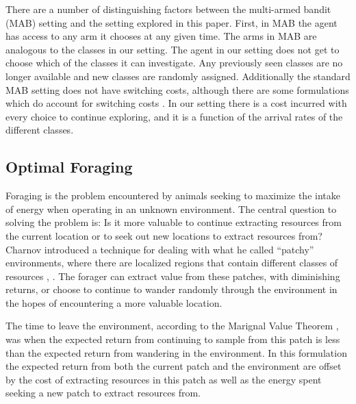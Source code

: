 
There are a number of distinguishing factors between the multi-armed bandit
(MAB) setting and the setting explored in this paper.  First, in MAB the agent
has access to any arm it chooses at any given time.  The arms in MAB are
analogous to the classes in our setting.  The agent in our setting does not get
to choose which of the classes it can investigate.  Any previously seen classes
are no longer available and new classes are randomly assigned.  Additionally
the standard MAB setting does not have switching costs, although there are some
formulations which do account for switching costs
\cite{jun2004survey}.  In our setting there is a cost incurred
with every choice to continue exploring, and it is a function of the arrival
rates of the different classes.

\subsection{Optimal Foraging}

Foraging is the problem encountered by animals seeking to maximize the intake
of energy when operating in an unknown environment.  The central question to
solving the problem is: Is it more valuable to continue extracting resources
from the current location or to seek out new locations to extract resources
from?  Charnov introduced a technique for dealing with what he called
``patchy'' environments, where there are localized regions that contain
different classes of resources \cite{charnov1973optimal},
\cite{charnov1976optimal}.  The forager can extract value from these patches,
with diminishing returns, or choose to continue to wander randomly through the
environment in the hopes of encountering a more valuable location.

The time to leave the environment, according to the Marignal Value Theorem
\cite{charnov1973optimal}, was when the expected return from continuing to
sample from this patch is less than the expected return from wandering in the
environment.  In this formulation the expected return from both the current
patch and the environment are offset by the cost of extracting resources in
this patch as well as the energy spent seeking a new patch to extract resources
from.

